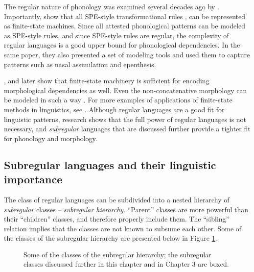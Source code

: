 The regular nature of phonology was examined several decades ago by \citep{Johnson1972,Kaplan1981PhonologicalRA,KaplanKay94}.
Importantly, \cite{KaplanKay94} show that all SPE-style transformational rules \citep{ChomskyHalle1968}, can be represented as finite-state machines.
Since all attested phonological patterns can be modeled as SPE-style rules, and since SPE-style rules are regular, the complexity of regular languages is a good upper bound for phonological dependencies.
In the same paper, they also presented a set of modeling tools and used them to capture patterns such as nasal assimilation and epenthesis.


\cite{Koskenniemi1983}, and later \cite{BeesleyKartunnen03} show that finite-state machinery is sufficient for encoding morphological dependencies as well.
Even the non-concatenative morphology can be modeled in such a way \citep{Kay1987,Beesley1996,Kiraz1996}.
For more examples of applications of finite-state methods in linguistics, see \citep{GildeaJurafsky1996,RocheSchabes1997,Hetherington2001,JurafskyMartin2009}.
Although regular languages are a good fit for linguistic patterns, research shows that the full power of regular languages is not necessary, and \emph{subregular} languages that are discussed further provide a tighter fit for phonology and morphology.


\subsection{Subregular languages and their linguistic importance}
\label{subgsgf}

The class of regular languages can be subdivided into a nested hierarchy of \emph{subregular} classes -- \emph{subregular hierarchy}.
``Parent'' classes are more powerful than their ``children'' classes, and therefore properly include them.
The ``sibling'' relation implies that the classes are not known to subsume each other.
Some of the classes of the subregular hierarchy are presented below in Figure \ref{subreghier}.

\begin{figure}[h!]
\begin{center}
\caption{Some of the classes of the subregular hierarchy; the subregular classes discussed further in this chapter and in Chapter 3 are boxed.}
\label{subreghier}
\end{center}
\end{figure}

